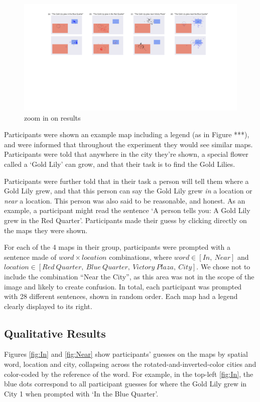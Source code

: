 \documentclass[10pt,letterpaper]{article}
\begin{document}
\begin{figure}[!t]
\center
\includegraphics[width=\textwidth]{figures/results1.pdf}
\caption{zoom in on results}
\label{fig:zoomIn}
\end{figure}

Participants were shown an example map including a legend (as in Figure ***), and were informed that throughout the experiment they would see similar maps. Participants were told that anywhere in the city they're shown, a special flower called a `Gold Lily' can grow, and that their task is to find the Gold Lilies. 

Participants were further told that in their task a person will tell them where a Gold Lily grew, and that this person can say the Gold Lily grew \textit{in} a location or \textit{near} a location. This person was also said to be reasonable, and honest. As an example, a participant might read the sentence `A person tells you: A Gold Lily grew in the Red Quarter'. Participants made their guess by clicking directly on the maps they were shown.

For each of the 4 maps in their group, participants were prompted with a sentence made of $word \times location$ combinations, where $word \in [In,\ Near]$ and $location \in [Red\ Quarter,\ Blue\ Quarter,\ Victory\ Plaza,\ City]$. We chose not to include the combination ``Near the City'', as this area was not in the scope of the image and likely to create confusion. In total, each participant was prompted with 28 different sentences, shown in random order. Each map had a legend clearly displayed to its right. 

\subsection{Qualitative Results} 

Figures \ref{fig:In} and \ref{fig:Near} show participants' guesses on the maps by spatial word, location and city, collapsing across the rotated-and-inverted-color cities and color-coded by the reference of the word. For example, in the top-left \ref{fig:In}, the blue dots correspond to all participant guesses for where the Gold Lily grew in City 1 when prompted with `In the Blue Quarter'. 
\end{document}
